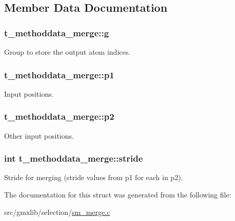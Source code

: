 \subsection{\-Member \-Data \-Documentation}
\hypertarget{structt__methoddata__merge_a379ce4c2c23b37ea15c5326ece594c51}{
\subsubsection[{g}]{ {\bf t\-\_\-methoddata\-\_\-merge\-::g}}}\label{structt__methoddata__merge_a379ce4c2c23b37ea15c5326ece594c51}
\-Group to store the output atom indices. \hypertarget{structt__methoddata__merge_af2fb8c8bb669699c46f1e328426b503b}{
\subsubsection[{p1}]{ {\bf t\-\_\-methoddata\-\_\-merge\-::p1}}}\label{structt__methoddata__merge_af2fb8c8bb669699c46f1e328426b503b}
\-Input positions. \hypertarget{structt__methoddata__merge_a67767a5c4384ec3d24bcf71b5b498ff4}{
\subsubsection[{p2}]{ {\bf t\-\_\-methoddata\-\_\-merge\-::p2}}}\label{structt__methoddata__merge_a67767a5c4384ec3d24bcf71b5b498ff4}
\-Other input positions. \hypertarget{structt__methoddata__merge_a2b8131ae7283a0dea25cf3372c5d743b}{
\subsubsection[{stride}]{\setlength{\rightskip}{0pt plus 5cm}int {\bf t\-\_\-methoddata\-\_\-merge\-::stride}}}\label{structt__methoddata__merge_a2b8131ae7283a0dea25cf3372c5d743b}
\-Stride for merging ({\ttfamily stride} values from {\ttfamily p1} for each in {\ttfamily p2}). 

\-The documentation for this struct was generated from the following file\-:\begin{DoxyCompactItemize}
\item 
src/gmxlib/selection/\hyperlink{sm__merge_8c}{sm\-\_\-merge.\-c}\end{DoxyCompactItemize}

